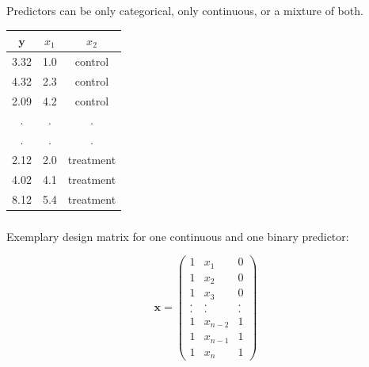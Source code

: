 \documentclass{beamer}
\begin{document}
\begin{frame}
  \frametitle{}
  Predictors can be only categorical, only continuous, or a mixture of both.
  \vspace{0.5cm}
  \begin{table}[h]
    \centering
    \begin{tabular}{ccc}
      \hline
      $\mathbf{y}$ & $x_1$ & $x_2$ \\
      \hline
      3.32 & 1.0 & control \\
      4.32 & 2.3 & control \\
      2.09 & 4.2 & control \\
      . & . & . \\
      . & . & . \\
      2.12 & 2.0 & treatment \\
      4.02 & 4.1 & treatment \\
      8.12 & 5.4 & treatment \\
      \hline
    \end{tabular}
  \end{table}
\end{frame}

\begin{frame}
  \frametitle{}
  Exemplary design matrix for one continuous and one binary predictor:
  
  \begin{equation*}
  \mathbf{x} = \left( \begin{array}{ccc} 1 & x_{1} & 0 \\ 1 & x_{2} & 0 \\ 1 & x_{3} & 0 \\ . & . & . \\ . & . & . \\ 1 & x_{n-2} & 1 \\ 1 & x_{n-1} & 1 \\ 1 & x_n & 1 \end{array}\right)
  \end{equation*}
\end{frame}
\end{document}
